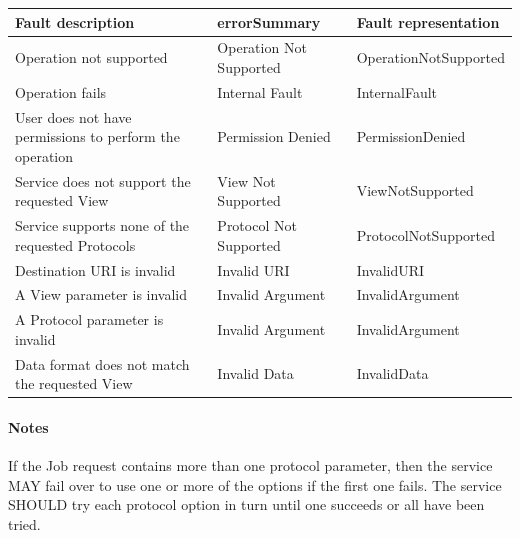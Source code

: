 \documentclass[11pt,a4paper]{ivoa}
\begin{document}
\vspace{3mm}
\begin{tabular}{ p{5cm} l p{4cm} }
\textbf{Fault description} & \textbf{errorSummary} & \textbf{Fault representation} \\
\hline
Operation not supported & Operation Not Supported & OperationNotSupported \\
\hline
Operation fails & Internal Fault & InternalFault \\
\hline
User does not have permissions to perform the operation	 & Permission Denied & PermissionDenied \\
\hline
Service does not support the requested View & View Not Supported & ViewNotSupported \\
\hline
Service supports none of the requested Protocols & Protocol Not Supported &ProtocolNotSupported \\
\hline
Destination URI is invalid & Invalid URI & InvalidURI \\
\hline
A View parameter is invalid & Invalid Argument & InvalidArgument \\
\hline
A Protocol parameter is invalid & Invalid Argument & InvalidArgument \\
\hline
Data format does not match the requested View & Invalid Data & InvalidData \\
\hline
\end{tabular}
\vspace{3mm}

\paragraph{Notes}
If the Job request contains more than one protocol parameter, then the service MAY fail over to use one or more of the options if the first one fails. The service SHOULD try each protocol option in turn until one succeeds or all have been tried.
\end{document}
